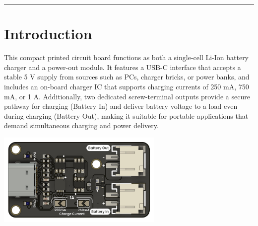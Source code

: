 \documentclass[10pt]{article}
\title{}
\author{}
\date{}
\begin{document}
\noindent
{}
\vspace{1em}
\hrule
\vspace{1.5em}

\section*{Introduction}
\vspace{0.5em}
\noindent
\begin{minipage}[t]{0.62\textwidth}
\setlength{\parskip}{0.75em}
\justifying
This compact printed circuit board functions as both a single-cell Li-Ion battery charger and a power-out module. It features a USB-C interface that accepts a stable 5 V supply from sources such as PCs, charger bricks, or power banks, and includes an on-board charger IC that supports charging currents of 250 mA, 750 mA, or 1 A. Additionally, two dedicated screw-terminal outputs provide a secure pathway for charging (Battery In) and deliver battery voltage to a load even during charging (Battery Out), making it suitable for portable applications that demand simultaneous charging and power delivery.
\end{minipage}
\hfill
\begin{minipage}[t]{0.35\textwidth}
\centering
\vspace{-0.5em}
\includegraphics[height=4.5cm,keepaspectratio]{./images/product.jpg}
\end{minipage}

\vspace{1.0em}
\FloatBarrier %
\end{document}
